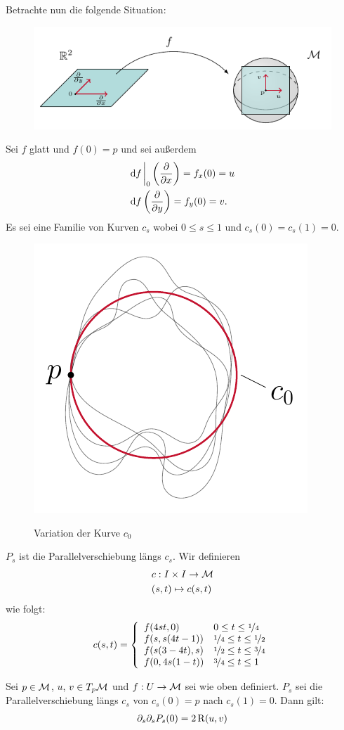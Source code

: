 Betrachte nun die folgende Situation:
\begin{figure}[H]
\centering
\includegraphics[width=1\linewidth]{figures/tikz/coordinates_r2_manifold.pdf}
\label{img:coordinates_r2_manifold}
\end{figure} 


Sei $f$ glatt und $f(0)=p$ und sei außerdem
\begin{align*}
& \dd f \eval_0 \left( \pdv{x} \right) = f_x (0) = u\\
& \dd f \left( \pdv{y}\right) = f_y(0) = v.
\end{align*}
Es sei eine Familie von Kurven $c_s$ wobei $0 \leq s \leq 1$ und $c_s (0) = c_s(1) = 0$.
\begin{figure}[H]
\centering
\includegraphics[width=0.4\linewidth]{figures/tikz/variantion_of_closed_curve.pdf}
\label{img:variantion_of_closed_curve}
\caption{Variation der Kurve $c_0$}
\end{figure} 

$P_s$ ist die Parallelverschiebung längs $c_s$.
Wir definieren
\begin{align*}
&c : I \times I \to \mathcal{M}\\
&(s, t) \mapsto c(s,t)
\end{align*}
wie folgt:
\begin{align}
c(s, t) = \left\{
\begin{array}{ll}
f(4 s t, 0) & 0 \leq t \leq \nicefrac{1}{4} \\
f(s, s(4t-1)) & \nicefrac{1}{4} \leq t \leq \nicefrac{1}{2}\\
f(s(3-4t), s) & \nicefrac{1}{2} \leq t \leq \nicefrac{3}{4}\\
f(0, 4s(1-t)) & \nicefrac{3}{4} \leq t \leq 1
\end{array}
\right. 
\end{align}
\begin{satz}
Sei $p \in \mathcal{M}$, $u$, $v \in T_p \mathcal{M}$ und $f: U \to \mathcal{M}$ sei wie oben definiert.
$P_s$ sei die Parallelverschiebung längs $c_s$ von $c_s(0) = p$ nach $c_s(1) = 0$.
Dann gilt:
\begin{align}
\partial_s \partial_s P_s(0) = 2 \operatorname{R} (u, v)
\end{align}
\end{satz}


